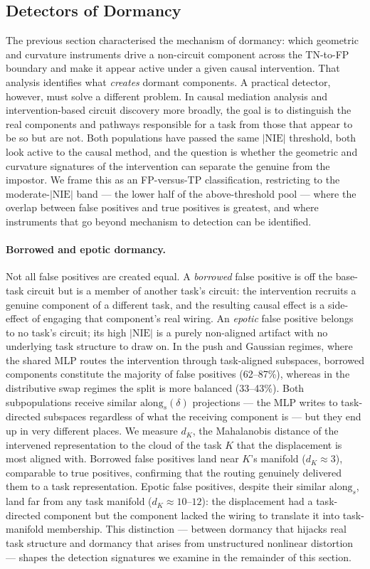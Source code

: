 \subsection{Detectors of Dormancy}

The previous section characterised the mechanism of dormancy: which geometric and curvature instruments drive a non-circuit component across the TN-to-FP boundary and make it appear active under a given causal intervention. That analysis identifies what \emph{creates} dormant components. A practical detector, however, must solve a different problem. In causal mediation analysis and intervention-based circuit discovery more broadly, the goal is to distinguish the real components and pathways responsible for a task from those that appear to be so but are not. Both populations have passed the same $|\mathrm{NIE}|$ threshold, both look active to the causal method, and the question is whether the geometric and curvature signatures of the intervention can separate the genuine from the impostor. We frame this as an FP-versus-TP classification, restricting to the moderate-$|\mathrm{NIE}|$ band --- the lower half of the above-threshold pool --- where the overlap between false positives and true positives is greatest, and where instruments that go beyond mechanism to detection can be identified.

\paragraph{Borrowed and epotic dormancy.}
Not all false positives are created equal. A \emph{borrowed} false positive is off the base-task circuit but is a member of another task's circuit: the intervention recruits a genuine component of a different task, and the resulting causal effect is a side-effect of engaging that component's real wiring. An \emph{epotic} false positive belongs to no task's circuit; its high $|\mathrm{NIE}|$ is a purely non-aligned artifact with no underlying task structure to draw on. In the push and Gaussian regimes, where the shared MLP routes the intervention through task-aligned subspaces, borrowed components constitute the majority of false positives (62--87\%), whereas in the distributive swap regimes the split is more balanced (33--43\%). Both subpopulations receive similar $\mathrm{along}_s(\delta)$ projections --- the MLP writes to task-directed subspaces regardless of what the receiving component is --- but they end up in very different places. We measure $d_K$, the Mahalanobis distance of the intervened representation to the cloud of the task $K$ that the displacement is most aligned with. Borrowed false positives land near $K$'s manifold ($d_K \approx 3$), comparable to true positives, confirming that the routing genuinely delivered them to a task representation. Epotic false positives, despite their similar $\mathrm{along}_s$, land far from any task manifold ($d_K \approx 10$--$12$): the displacement had a task-directed component but the component lacked the wiring to translate it into task-manifold membership. This distinction --- between dormancy that hijacks real task structure and dormancy that arises from unstructured nonlinear distortion --- shapes the detection signatures we examine in the remainder of this section.

